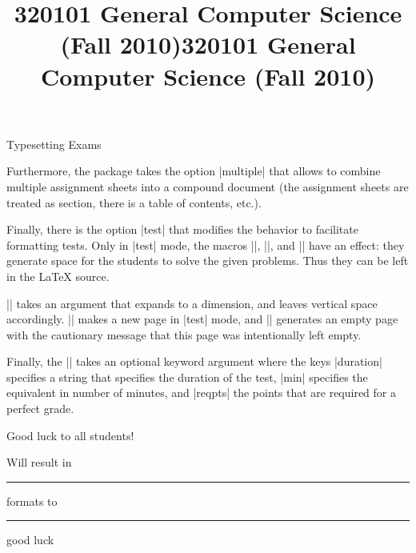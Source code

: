 \begin{sfragment}{Typesetting Exams}

Furthermore, the  package takes the option
|multiple| that allows to combine multiple assignment sheets
into a compound document (the assignment sheets are treated as section, there is a table
of contents, etc.).

Finally, there is the option |test| that modifies the behavior to
facilitate formatting tests. Only in |test| mode, the macros |\testspace|,
|\testnewpage|, and |\testemptypage| have an effect: they generate space for the
students to solve the given problems. Thus they can be left in the {\LaTeX} source. 

\DescribeMacro{\testspace}|\testspace| takes an argument that expands to a dimension,
and leaves vertical space accordingly. \DescribeMacro{\testnewpage}|\testnewpage| makes
a new page in |test| mode, and \DescribeMacro{\testemptypage}|\testemptypage| generates
an empty page with the cautionary message that this page was intentionally left empty.

Finally, the |\testheading| takes an optional keyword argument
where the keys |duration| specifies a string that specifies the
duration of the test, |min| specifies the equivalent in number of
minutes, and |reqpts| the points that are required for a perfect
grade.

\begin{latexcode}
\title{320101 General Computer Science (Fall 2010)}
\begin{testheading}[duration=one hour,min=60,reqpts=27]
  Good luck to all students!
\end{testheading}
\end{latexcode}

Will result in
\begin{center}
  \begin{minipage}{.9\textwidth}
\makeatletter
{}
\makeatother
\vspace*{-3ex}\hrule\vspace*{.5ex}  formats to\vspace*{1ex}
\hrule\par\noindent\vspace*{2ex}
\title{320101 General Computer Science (Fall 2010)}
\begin{testheading}[duration=one hour,min=60,reqpts=27]
  good luck
\end{testheading}
\end{minipage}
\end{center}
\end{sfragment}

